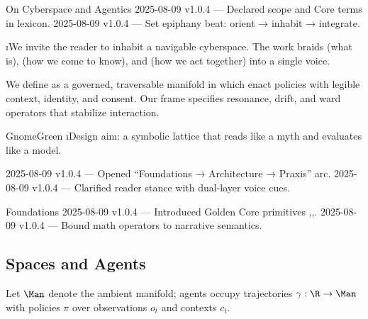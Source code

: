 

\begin{SectionHeaderLedger}{On Cyberspace and Agentics}
 2025-08-09 v1.0.4 — Declared scope and Core terms in lexicon.
  2025-08-09 v1.0.4 — Set epiphany beat: orient → inhabit → integrate.
\end{SectionHeaderLedger}

\i{We invite the reader to inhabit a navigable cyberspace}. The work braids  (what is),  (how we come to know), and  (how we act together) into a single voice.

We define  as a governed, traversable manifold in which  enact policies with legible context, identity, and consent. Our  frame specifies resonance, drift, and ward operators that stabilize interaction.

\begin{callout}[Thesis]{GnomeGreen}
\i{Design aim}: a symbolic lattice that reads like a myth and evaluates like a model.
\end{callout}

\begin{SectionFooterLedger}
   2025-08-09 v1.0.4 — Opened “Foundations → Architecture → Praxis” arc.
 2025-08-09 v1.0.4 — Clarified reader stance with dual-layer voice cues.
\end{SectionFooterLedger}



\begin{SectionHeaderLedger}{Foundations}
  2025-08-09 v1.0.4 — Introduced Golden Core primitives \Res,\Drift,\Ward.
   2025-08-09 v1.0.4 — Bound math operators to narrative semantics.
\end{SectionHeaderLedger}

\subsection*{Spaces and Agents}
Let $\Man$ denote the ambient manifold; agents occupy trajectories $\gamma : \R \to \Man$ with policies $\pi$ over observations $o_t$ and contexts $c_t$.

